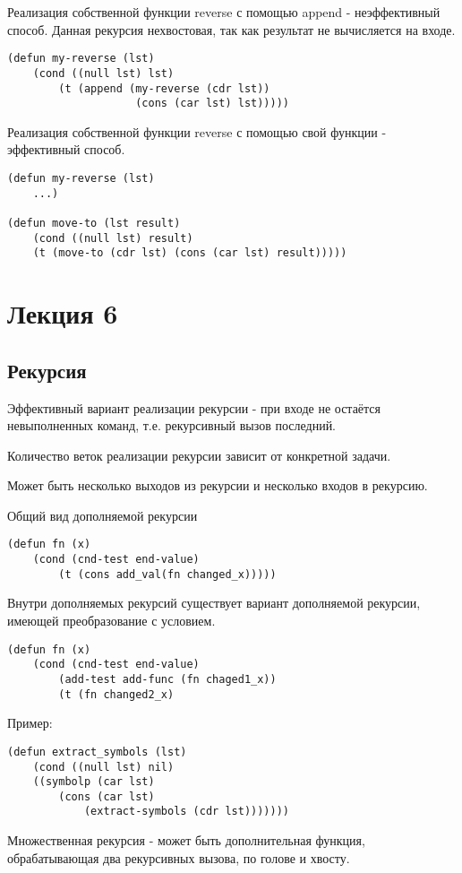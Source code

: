 Реализация собственной функции reverse с помощью append - неэффективный способ. Данная рекурсия нехвостовая, так как результат не вычисляется на входе.
\begin{lstlisting}
(defun my-reverse (lst)
	(cond ((null lst) lst)
		(t (append (my-reverse (cdr lst))
					(cons (car lst) lst)))))
\end{lstlisting}

Реализация собственной функции reverse с помощью свой функции - эффективный способ.
\begin{lstlisting}
(defun my-reverse (lst)
	...)

(defun move-to (lst result)
	(cond ((null lst) result)
	(t (move-to (cdr lst) (cons (car lst) result)))))
\end{lstlisting}

\chapter{Лекция 6}
\section{Рекурсия}
Эффективный вариант реализации рекурсии - при входе не остаётся невыполненных команд, т.е. рекурсивный вызов последний.

Количество веток реализации рекурсии зависит от конкретной задачи.

Может быть несколько выходов из рекурсии и несколько входов в рекурсию.

Общий вид дополняемой рекурсии
\begin{lstlisting}
(defun fn (x)
	(cond (cnd-test end-value)
		(t (cons add_val(fn changed_x)))))
\end{lstlisting}

Внутри дополняемых рекурсий существует вариант дополняемой рекурсии, имеющей преобразование с условием.
\begin{lstlisting}
(defun fn (x)
	(cond (cnd-test end-value)
		(add-test add-func (fn chaged1_x))
		(t (fn changed2_x)
\end{lstlisting}

Пример:
\begin{lstlisting}
(defun extract_symbols (lst)
	(cond ((null lst) nil)
	((symbolp (car lst)
		(cons (car lst)
			(extract-symbols (cdr lst)))))))
\end{lstlisting}

Множественная рекурсия - может быть дополнительная функция, обрабатывающая два рекурсивных вызова, по голове и хвосту.

